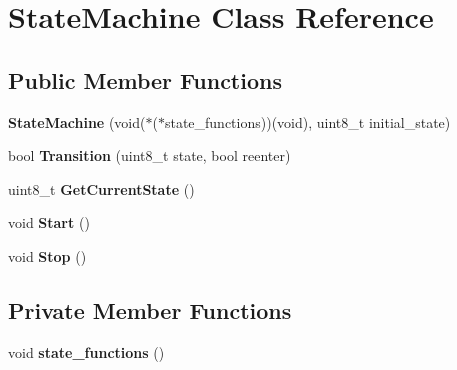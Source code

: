 \hypertarget{class_state_machine}{\section{State\-Machine Class Reference}
\label{class_state_machine}
}
\subsection*{Public Member Functions}
\begin{DoxyCompactItemize}
\item 
\hypertarget{class_state_machine_a4446455ccfb1638fc70c59143082ecb4}{{\bfseries State\-Machine} (void($\ast$($\ast$state\-\_\-functions))(void), uint8\-\_\-t initial\-\_\-state)}\label{class_state_machine_a4446455ccfb1638fc70c59143082ecb4}

\item 
\hypertarget{class_state_machine_a1597799edc5a89006f164e52fd72d02b}{bool {\bfseries Transition} (uint8\-\_\-t state, bool reenter)}\label{class_state_machine_a1597799edc5a89006f164e52fd72d02b}

\item 
\hypertarget{class_state_machine_a62fd24666d16a2425c8397ce2d326dae}{uint8\-\_\-t {\bfseries Get\-Current\-State} ()}\label{class_state_machine_a62fd24666d16a2425c8397ce2d326dae}

\item 
\hypertarget{class_state_machine_a94c93f8203bab4f5a3784eba7445b582}{void {\bfseries Start} ()}\label{class_state_machine_a94c93f8203bab4f5a3784eba7445b582}

\item 
\hypertarget{class_state_machine_a2eb142249e4c483c8a329b1a18b4383f}{void {\bfseries Stop} ()}\label{class_state_machine_a2eb142249e4c483c8a329b1a18b4383f}

\end{DoxyCompactItemize}
\subsection*{Private Member Functions}
\begin{DoxyCompactItemize}
\item 
\hypertarget{class_state_machine_acc87359cd98c436f5b891ffe6cb67160}{void {\bfseries state\-\_\-functions} ()}\label{class_state_machine_acc87359cd98c436f5b891ffe6cb67160}

\end{DoxyCompactItemize}
